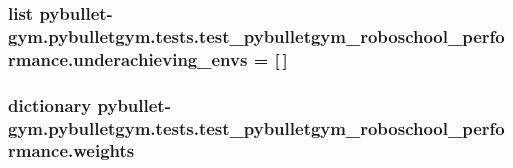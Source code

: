 \subsubsection[{\texorpdfstring{underachieving\+\_\+envs}{underachieving_envs}}]{\setlength{\rightskip}{0pt plus 5cm}list pybullet-\/gym.\+pybulletgym.\+tests.\+test\+\_\+pybulletgym\+\_\+roboschool\+\_\+performance.\+underachieving\+\_\+envs = \mbox{[}$\,$\mbox{]}}\hypertarget{namespacepybullet-gym_1_1pybulletgym_1_1tests_1_1test__pybulletgym__roboschool__performance_ae47d2fc9e704befe6ca4110975aa02c8}{}\label{namespacepybullet-gym_1_1pybulletgym_1_1tests_1_1test__pybulletgym__roboschool__performance_ae47d2fc9e704befe6ca4110975aa02c8}
\subsubsection[{\texorpdfstring{weights}{weights}}]{\setlength{\rightskip}{0pt plus 5cm}dictionary pybullet-\/gym.\+pybulletgym.\+tests.\+test\+\_\+pybulletgym\+\_\+roboschool\+\_\+performance.\+weights}\hypertarget{namespacepybullet-gym_1_1pybulletgym_1_1tests_1_1test__pybulletgym__roboschool__performance_a0b2e99d8eaf97a2ec79c583d8b5e40c0}{}\label{namespacepybullet-gym_1_1pybulletgym_1_1tests_1_1test__pybulletgym__roboschool__performance_a0b2e99d8eaf97a2ec79c583d8b5e40c0}
